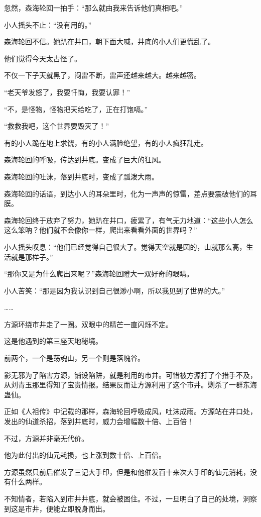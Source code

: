 \begin{this_body}
忽然，森海轮回一拍手：“那么就由我来告诉他们真相吧。”

小人摇头不止：“没有用的。”

森海轮回不信。她趴在井口，朝下面大喊，井底的小人们更慌乱了。

他们觉得今天太古怪了。

不仅一下子天就黑了，闷雷不断，雷声还越来越大。越来越密。

“老天爷发怒了，我要忏悔，我要认罪！”

“不，是怪物，怪物把天给吃了，正在打饱嗝。”

“救救我吧，这个世界要毁灭了！”

有的小人跪在地上求饶，有的小人满脸绝望，有的小人疯狂乱走。

森海轮回的呼吸，传达到井底。变成了巨大的狂风。

森海轮回的吐沫，落到井底时，变成了瓢泼大雨。

森海轮回的话语，到达小人的耳朵里时，化为一声声的惊雷，差点要震破他们的耳膜。

森海轮回终于放弃了努力，她趴在井口，疲累了，有气无力地道：“这些小人怎么这么笨呐？他们就不会像你一样，爬出来看看外面的世界吗？”

小人摇头叹息：“他们已经觉得自己很大了。觉得天空就是圆的，山就那么高，生活就是那样子。”

“那你又是为什么爬出来呢？”森海轮回瞪大一双好奇的眼睛。

小人苦笑：“那是因为我认识到自己很渺小啊，所以我见到了世界的大。”

……

方源环绕市井走了一圈。双眼中的精芒一直闪烁不定。

这是他遇到的第三座天地秘境。

前两个，一个是荡魂山，另一个则是落魄谷。

影无邪为了陷害方源，铺设陷阱，就是利用的市井。可惜被方源打了个措手不及，从刘青玉那里得知了宝贵情报。结果反而让方源利用了这个市井。剿杀了一群东海蛊仙。

正如《人祖传》中记载的那样，森海轮回呼吸成风，吐沫成雨。方源站在井口处，发出的仙道杀招，落到井底时，威力会增幅数十倍、上百倍！

不过，方源并非毫无代价。

他为此付出的仙元耗损，也上涨到数十倍、上百倍。

方源虽然只前后催发了三记大手印，但是和他催发百十来次大手印的仙元消耗，没有什么两样。

不知情者，若陷入到市井井底，就会被困住。不过，一旦明白了自己的处境，洞察到这是市井，便能立即脱身而出。


\end{this_body}
